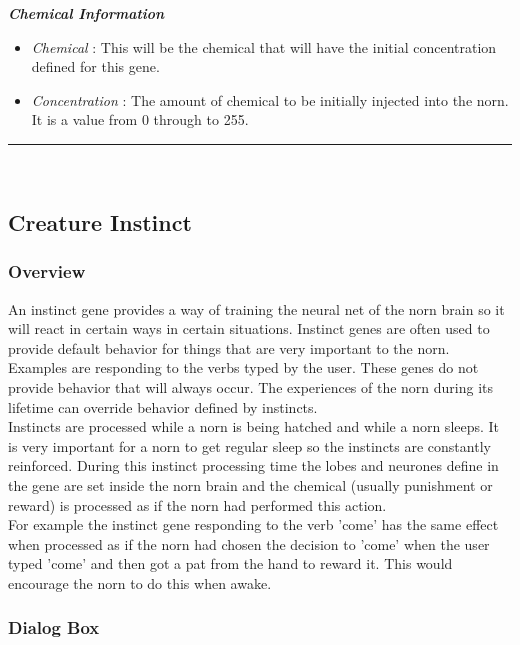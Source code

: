 \documentclass[11pt,twoside,a4paper]{article}
\begin{document}
\textbf{\textit{Chemical Information}}
\begin{itemize}
	\item[] \emph{Chemical} : This will be the chemical that will have the initial concentration defined for this gene.
	\item[] \emph{Concentration} : The amount of chemical to be initially injected into the norn. It is a value from 0 through to 255.
\end{itemize}

\rule{10cm}{0.5mm}~\\

\subsection{Creature Instinct} %

\subsubsection{Overview}

An instinct gene provides a way of training the neural net of the norn brain so it will react in certain ways in certain situations. Instinct genes are often used to provide default behavior for things that are very important to the norn. Examples are responding to the verbs typed by the user. These genes do not provide behavior that will always occur. The experiences of the norn during its lifetime can override behavior defined by instincts.~\\

Instincts are processed while a norn is being hatched and while a norn sleeps. It is very important for a norn to get regular sleep so the instincts are constantly reinforced. During this instinct processing time the lobes and neurones define in the gene are set inside the norn brain and the chemical (usually punishment or reward) is processed as if the norn had performed this action.~\\

For example the instinct gene responding to the verb 'come' has the same effect when processed as if the norn had chosen the decision to 'come' when the user typed 'come' and then got a pat from the hand to reward it. This would encourage the norn to do this when awake.

\subsubsection{Dialog Box}
\end{document}
